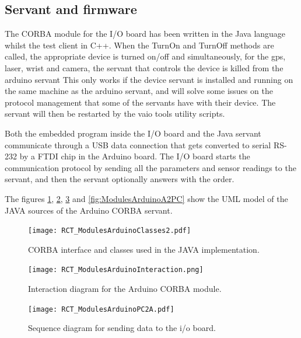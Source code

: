 \subsection{Servant and firmware}
The CORBA module for the I/O board has been written in the Java language whilst the test client in C++.
When the TurnOn and TurnOff methods are called, the appropriate device is turned
on/off and simultaneously, for the gps, laser, wrist and camera, the servant
that controls the device is killed from the arduino servant This only works if
the device servant is installed and running on the same machine as the arduino
servant, and will solve some issues on the protocol management that some of the
servants have with their device. The servant will then be restarted by the vaio
tools utility scripts.

Both the embedded program inside the I/O board and the Java servant communicate
through a USB data connection that gets converted to serial RS-232 by a FTDI chip in the Arduino board.
The I/O board starts the
communication protocol by sending all the parameters and sensor readings to the
servant, and then the servant optionally answers with the order.

The figures \ref{fig:ModulesArduinoClasses}, \ref{fig:ModulesArduinoInteraction},
\ref{fig:ModulesArduinoPC2A} and \ref{fig:ModulesArduinoA2PC} show the UML model
of the JAVA sources of the Arduino CORBA servant.

\begin{figure}[htbp]
\begin{center}
 {\texttt{[image: RCT\_ModulesArduinoClasses2.pdf]}}
\end{center}
\caption{CORBA interface and classes used in the JAVA implementation.}
\label{fig:ModulesArduinoClasses}
\end{figure}

\begin{figure}[htbp]
\begin{center}
 {\texttt{[image: RCT\_ModulesArduinoInteraction.png]}}
\end{center}
\caption{Interaction diagram for the Arduino CORBA module.}
\label{fig:ModulesArduinoInteraction}
\end{figure}

\begin{figure}[htbp]
\begin{center}
 {\texttt{[image: RCT\_ModulesArduinoPC2A.pdf]}}
\end{center}
\caption{Sequence diagram for sending data to the i/o board.}
\label{fig:ModulesArduinoPC2A}
\end{figure}

